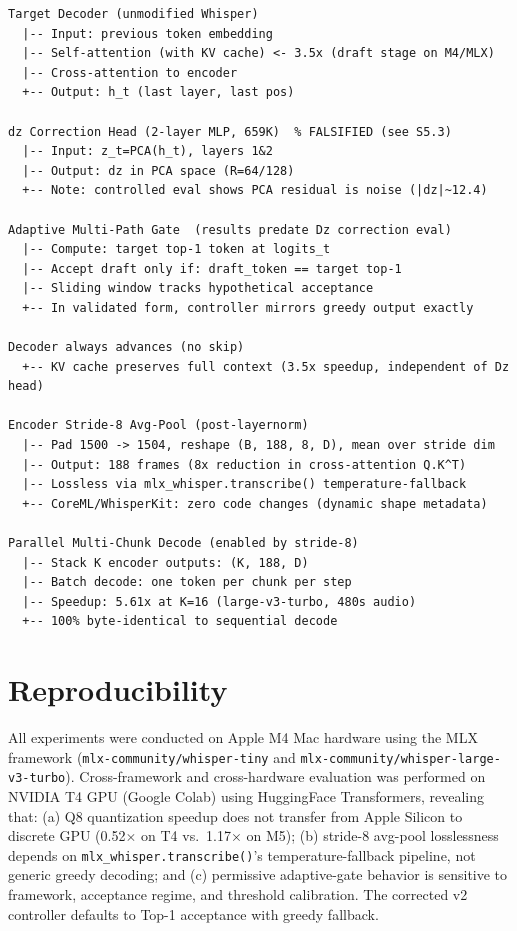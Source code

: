 \documentclass[11pt,a4paper]{article}
\begin{document}
\begin{lstlisting}[caption={Whisper-Flash final architecture.},basicstyle=\ttfamily\footnotesize]
Target Decoder (unmodified Whisper)
  |-- Input: previous token embedding
  |-- Self-attention (with KV cache) <- 3.5x (draft stage on M4/MLX)
  |-- Cross-attention to encoder
  +-- Output: h_t (last layer, last pos)

dz Correction Head (2-layer MLP, 659K)  % FALSIFIED (see S5.3)
  |-- Input: z_t=PCA(h_t), layers 1&2
  |-- Output: dz in PCA space (R=64/128)
  +-- Note: controlled eval shows PCA residual is noise (|dz|~12.4)

Adaptive Multi-Path Gate  (results predate Dz correction eval)
  |-- Compute: target top-1 token at logits_t
  |-- Accept draft only if: draft_token == target top-1
  |-- Sliding window tracks hypothetical acceptance
  +-- In validated form, controller mirrors greedy output exactly

Decoder always advances (no skip)
  +-- KV cache preserves full context (3.5x speedup, independent of Dz head)

Encoder Stride-8 Avg-Pool (post-layernorm)
  |-- Pad 1500 -> 1504, reshape (B, 188, 8, D), mean over stride dim
  |-- Output: 188 frames (8x reduction in cross-attention Q.K^T)
  |-- Lossless via mlx_whisper.transcribe() temperature-fallback
  +-- CoreML/WhisperKit: zero code changes (dynamic shape metadata)

Parallel Multi-Chunk Decode (enabled by stride-8)
  |-- Stack K encoder outputs: (K, 188, D)
  |-- Batch decode: one token per chunk per step
  |-- Speedup: 5.61x at K=16 (large-v3-turbo, 480s audio)
  +-- 100% byte-identical to sequential decode
\end{lstlisting}

\section{Reproducibility}
\label{app:repro}

{\sloppy
All experiments were conducted on Apple M4 Mac hardware using the MLX framework (\texttt{mlx-community/whisper-tiny} and \texttt{mlx-community/whisper-large-v3-turbo}).
Cross-framework and cross-hardware evaluation was performed on NVIDIA T4 GPU (Google Colab) using HuggingFace Transformers, revealing that: (a) Q8 quantization speedup does not transfer from Apple Silicon to discrete GPU (0.52$\times$ on T4 vs.\ 1.17$\times$ on M5); (b) stride-8 avg-pool losslessness depends on \texttt{mlx\_whisper.transcribe()}'s temperature-fallback pipeline, not generic greedy decoding; and (c) permissive adaptive-gate behavior is sensitive to framework, acceptance regime, and threshold calibration.
The corrected v2 controller defaults to Top-1 acceptance with greedy fallback.
\par}
\end{document}
